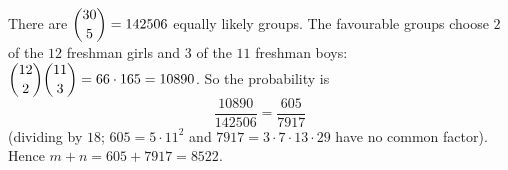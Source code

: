 There are $\dbinom{30}{5}=142506$ equally likely groups. The favourable groups choose $2$ of the $12$ freshman girls and $3$ of the $11$ freshman boys: $\dbinom{12}{2}\dbinom{11}{3}=66\cdot165=10890$. So the probability is
\[
\dfrac{10890}{142506}=\dfrac{605}{7917}
\]
(dividing by $18$; $605=5\cdot11^2$ and $7917=3\cdot7\cdot13\cdot29$ have no common factor). Hence $m+n=605+7917=\boxed{8522}$.
